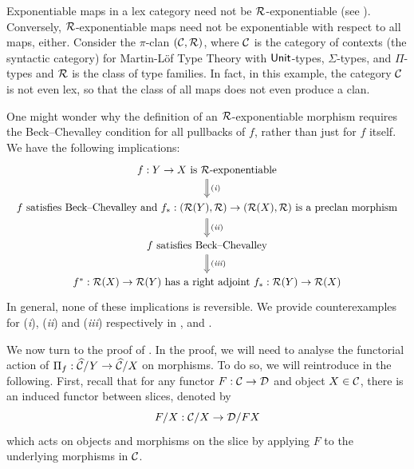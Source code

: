 \begin{remark}[Counterexamples]\label{rmk:counterexample} 
  Exponentiable maps in a lex category
  need not be $\mathcal{R}$-exponentiable
  (see ).
  Conversely, $\mathcal{R}$-exponentiable maps need not be exponentiable
  with respect to all maps, either.
  Consider the $\pi$-clan $(\mathcal{C},\mathcal{R})$, where 
  $\mathcal{C}$ is the category of contexts
  (the syntactic category)
  for Martin-L\"of Type Theory with
  $\mathsf{Unit}$-types, $\Sigma$-types, and $\Pi$-types
  and $\mathcal{R}$ is the class of type families.
  In fact, in this example, the category $\mathcal{C}$ is not even lex,
  so that the class of all maps does not even produce a clan.
  
  One might wonder why the definition of an $\mathcal{R}$-exponentiable morphism
  requires the Beck--Chevalley condition for all pullbacks of $f$,
  rather than just for $f$ itself.
  We have the following implications:
  \[
    \begin{tikzcd}
      \text{$f : Y \to X$ is $\RR$-exponentiable}
      \ar[d, Rightarrow, "\text{\,(\textit{i})}"] \\
      {\begin{array}{c}
        \text{$f$ satisfies Beck--Chevalley and $f_* : (\RR(Y), \RR) \to (\RR(X), \RR)$ is a preclan morphism}
      \end{array}}
      \ar[d, Rightarrow, "\text{\,(\textit{ii})}"] \\
      \text{$f$ satisfies Beck--Chevalley}
      \ar[d, Rightarrow, "\text{\,(\textit{iii})}"] \\
      \text{$f^* : \RR(X) \to \RR(Y)$ has a right adjoint $f_* : \RR(Y) \to \RR(X)$}
    \end{tikzcd}
  \]
  In general, none of these implications is reversible.
  We provide counterexamples for (\textit{i}), (\textit{ii}) and (\textit{iii})
  respectively in , 
  and .
\end{remark}

We now turn to the proof of .
In the proof,
we will need to analyse the functorial action of $\Pi_f : \widehat{\mathcal{C}}/Y \to \widehat{\mathcal{C}}/X$ on morphisms.
To do so, we will reintroduce \cite[Lemmas 2.3.1 and 2.3.2]{joyal2017}
in the following.
First, recall that for any functor
$F : \mathcal{C} \to \mathcal{D}$ and object $X \in \mathcal{C}$,
there is an induced functor between slices, denoted by
\[ F / X : \mathcal{C} / X \to \mathcal{D} / F X\]
which acts on objects and morphisms on the slice by
applying $F$ to the underlying morphisms in $\mathcal{C}$.

